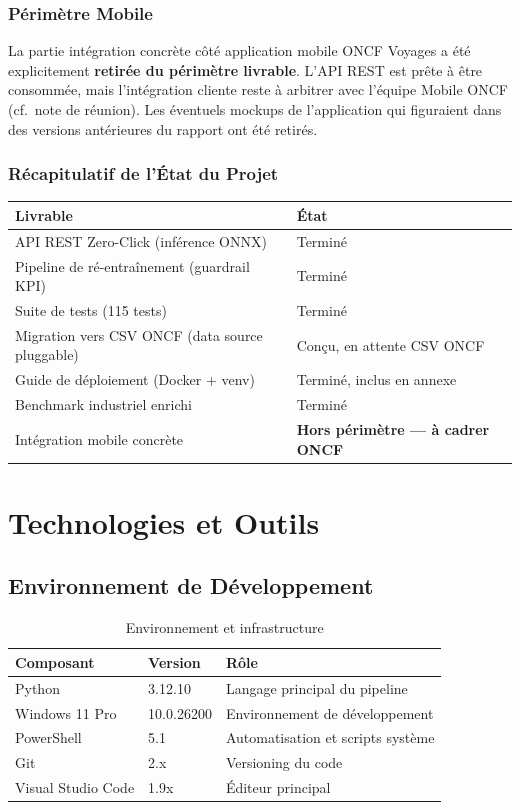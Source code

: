 \documentclass[12pt, a4paper]{report}
\begin{document}
\subsection{Périmètre Mobile}

La partie intégration concrète côté application mobile ONCF Voyages a été
explicitement \textbf{retirée du périmètre livrable}. L'API REST est
prête à être consommée, mais l'intégration cliente reste à arbitrer avec
l'équipe Mobile ONCF (cf.\ note de réunion). Les éventuels mockups de
l'application qui figuraient dans des versions antérieures du rapport
ont été retirés.

\subsection{Récapitulatif de l'État du Projet}

\begin{tabularx}{\linewidth}{@{}lX@{}}
\toprule
\textbf{Livrable} & \textbf{État} \\
\midrule
API REST Zero-Click (inférence ONNX) & Terminé \\
Pipeline de ré-entraînement (guardrail KPI) & Terminé \\
Suite de tests (115 tests) & Terminé \\
Migration vers CSV ONCF (data source pluggable) & Conçu, en attente CSV ONCF \\
Guide de déploiement (Docker + venv) & Terminé, inclus en annexe \\
Benchmark industriel enrichi & Terminé \\
Intégration mobile concrète & \textbf{Hors périmètre --- à cadrer ONCF} \\
\bottomrule
\end{tabularx}

\chapter{Technologies et Outils}

\section{Environnement de Développement}

\begin{table}[H]
\centering
\caption{Environnement et infrastructure}
\begin{tabularx}{\textwidth}{|l|l|X|}
\hline
\textbf{Composant} & \textbf{Version} & \textbf{Rôle} \\
\hline
Python & 3.12.10 & Langage principal du pipeline \\
\hline
Windows 11 Pro & 10.0.26200 & Environnement de développement \\
\hline
PowerShell & 5.1 & Automatisation et scripts système \\
\hline
Git & 2.x & Versioning du code \\
\hline
Visual Studio Code & 1.9x & Éditeur principal \\
\hline
\end{tabularx}
\end{table}
\end{document}

